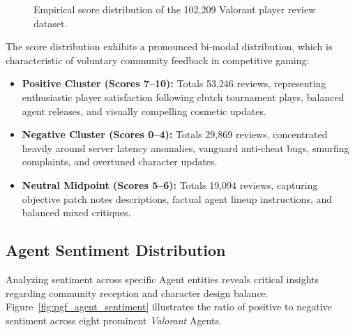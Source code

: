 \begin{figure}[htbp]
\centering
{}
\caption{Empirical score distribution of the 102,209 Valorant player review dataset.}
\label{fig:pgf_score_dist}
\end{figure}

The score distribution exhibits a pronounced bi-modal distribution, which is characteristic of voluntary community feedback in competitive gaming:
\begin{itemize}
    \item \textbf{Positive Cluster (Scores 7--10):} Totals 53,246 reviews, representing enthusiastic player satisfaction following clutch tournament plays, balanced agent releases, and visually compelling cosmetic updates.
    \item \textbf{Negative Cluster (Scores 0--4):} Totals 29,869 reviews, concentrated heavily around server latency anomalies, vanguard anti-cheat bugs, smurfing complaints, and overtuned character updates.
    \item \textbf{Neutral Midpoint (Scores 5--6):} Totals 19,094 reviews, capturing objective patch notes descriptions, factual agent lineup instructions, and balanced mixed critiques.
\end{itemize}

\subsection{Agent Sentiment Distribution}
Analyzing sentiment across specific Agent entities reveals critical insights regarding community reception and character design balance. Figure~\ref{fig:pgf_agent_sentiment} illustrates the ratio of positive to negative sentiment across eight prominent \textit{Valorant} Agents.

